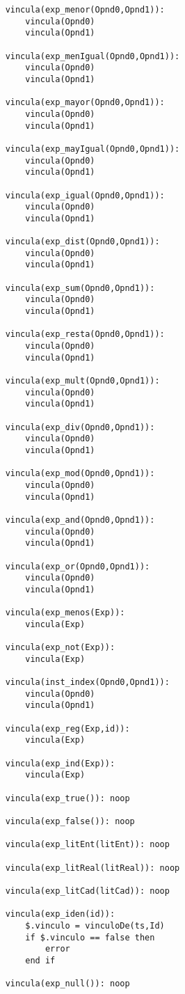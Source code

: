 \begin{lstlisting}
    vincula(exp_menor(Opnd0,Opnd1)):
        vincula(Opnd0)
        vincula(Opnd1)

    vincula(exp_menIgual(Opnd0,Opnd1)):
        vincula(Opnd0)
        vincula(Opnd1)

    vincula(exp_mayor(Opnd0,Opnd1)):
        vincula(Opnd0)
        vincula(Opnd1)

    vincula(exp_mayIgual(Opnd0,Opnd1)):
        vincula(Opnd0)
        vincula(Opnd1)

    vincula(exp_igual(Opnd0,Opnd1)):
        vincula(Opnd0)
        vincula(Opnd1)

    vincula(exp_dist(Opnd0,Opnd1)):
        vincula(Opnd0)
        vincula(Opnd1)

    vincula(exp_sum(Opnd0,Opnd1)):
        vincula(Opnd0)
        vincula(Opnd1)

    vincula(exp_resta(Opnd0,Opnd1)):
        vincula(Opnd0)
        vincula(Opnd1)

    vincula(exp_mult(Opnd0,Opnd1)):
        vincula(Opnd0)
        vincula(Opnd1)

    vincula(exp_div(Opnd0,Opnd1)):
        vincula(Opnd0)
        vincula(Opnd1)

    vincula(exp_mod(Opnd0,Opnd1)):
        vincula(Opnd0)
        vincula(Opnd1)

    vincula(exp_and(Opnd0,Opnd1)):
        vincula(Opnd0)
        vincula(Opnd1)

    vincula(exp_or(Opnd0,Opnd1)):
        vincula(Opnd0)
        vincula(Opnd1)

    vincula(exp_menos(Exp)):
        vincula(Exp)

    vincula(exp_not(Exp)):
        vincula(Exp)

    vincula(inst_index(Opnd0,Opnd1)):
        vincula(Opnd0)
        vincula(Opnd1)

    vincula(exp_reg(Exp,id)):
        vincula(Exp)

    vincula(exp_ind(Exp)):
        vincula(Exp)

    vincula(exp_true()): noop

    vincula(exp_false()): noop

    vincula(exp_litEnt(litEnt)): noop

    vincula(exp_litReal(litReal)): noop

    vincula(exp_litCad(litCad)): noop

    vincula(exp_iden(id)):
        $.vinculo = vinculoDe(ts,Id)
        if $.vinculo == false then
            error
        end if

    vincula(exp_null()): noop


\end{lstlisting}

